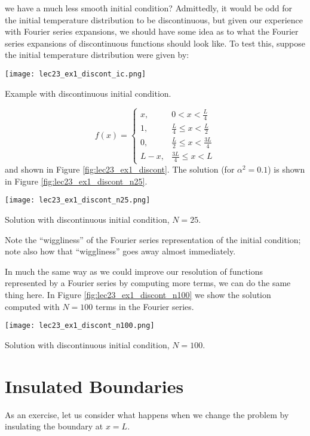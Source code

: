  we have a much less smooth initial condition?  Admittedly, it would be odd for the initial temperature distribution to be discontinuous, but given our experience with Fourier series expansions, we should have some idea as to what the Fourier series expansions of discontinuous functions should look like.  To test this, suppose the initial temperature distribution were given by:
\begin{marginfigure}
\texttt{[image: lec23\_ex1\_discont\_ic.png]}
\caption{Example with discontinuous initial condition.}
\label{fig:lec23_ex1_discont}
\end{marginfigure}
\begin{equation*}
f(x) = 
\begin{cases}
x, & 0 < x < \frac{L}{4} \\
1, & \frac{L}{4} \le x < \frac{L}{2} \\
0, & \frac{L}{2} \le x < \frac{3L}{4} \\
L-x, & \frac{3L}{4} \le x < L

\end{cases}
\end{equation*}
and shown in Figure \ref{fig:lec23_ex1_discont}. The solution (for $\alpha^2=0.1$) is shown in Figure \ref{fig:lec23_ex1_discont_n25}.
\begin{marginfigure}
\texttt{[image: lec23\_ex1\_discont\_n25.png]}
\caption{Solution with discontinuous initial condition, $N=25$.}
\label{fig:lec23_ex1_discont_n25}
\end{marginfigure}
Note the ``wiggliness'' of the Fourier series representation of the initial condition; note also how that ``wiggliness'' goes away almost immediately.

In much the same way as we could improve our resolution of functions represented by a Fourier series by computing more terms, we can do the same thing here.  In Figure \ref{fig:lec23_ex1_discont_n100} we show the solution computed with $N=100$ terms in the Fourier series.
\begin{marginfigure}
\texttt{[image: lec23\_ex1\_discont\_n100.png]}
\caption{Solution with discontinuous initial condition, $N=100$.}
\label{fig:lec23_ex1_discont_n100}
\end{marginfigure}

\section{Insulated Boundaries}
As an exercise, let us consider what happens when we change the problem by insulating the boundary at $x=L$.  

